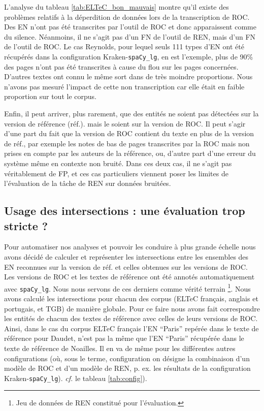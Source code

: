 L'analyse du tableau \ref{tab:ELTeC_bon_mauvais} montre qu'il existe des problèmes relatifs à la déperdition de données lors de la transcription de ROC. Des EN n'ont pas été transcrites par l'outil de ROC et donc apparaissent comme du silence. Néanmoins, il ne s'agit pas d'un FN de l'outil de REN, mais d'un FN de l'outil de ROC. Le cas Reynolds, pour lequel seuls 111 types d'EN ont été récupérés dans la configuration Kraken-\texttt{spaCy\_lg}, en est l'exemple, plus de 90\% des pages n'ont pas été transcrites à cause du flou sur les pages concernées. D'autres textes ont connu le même sort dans de très moindre proportions. Nous n'avons pas mesuré l'impact de cette non transcription car elle était en faible proportion sur tout le corpus.


Enfin, il peut arriver, plus rarement, que des entités ne soient pas détectées sur la version de référence (réf.). mais le soient sur la version de ROC. Il peut s'agir d'une part du fait que la version de ROC contient du texte en plus de la version de réf., par exemple les notes de bas de pages transcrites par la ROC mais non prises en compte par les auteurs de la référence, ou, d'autre part  d’une erreur du système même en contexte non bruité. Dans ces deux cas, il ne s’agit pas véritablement de FP, et ces cas particuliers viennent poser les limites de l'évaluation de la tâche de REN sur données bruitées.


\subsection{Usage des intersections : une évaluation trop stricte ?}
\label{subsec:inter_OCR-IMPACT-NER}
Pour automatiser nos analyses et pouvoir les conduire à plus grande échelle nous avons décidé de calculer et représenter les intersections entre les ensembles des EN reconnues sur la version de réf. et celles obtenues sur les versions de ROC. Les versions de ROC et les textes de référence ont été annotés automatiquement avec \texttt{spaCy\_lg}. Nous nous servons de ces derniers comme vérité terrain \footnote{Jeu de données de REN constitué pour l'évaluation.}. Nous avons calculé les intersections pour chacun des corpus (ELTeC français, anglais et portugais, et TGB) de manière globale. 
Pour ce faire nous avons fait correspondre les entités de chacun des textes de référence avec celles de leurs versions de ROC. Ainsi, dans le cas du corpus ELTeC français l'EN ``Paris'' repérée dans le texte de référence pour Daudet, n'est pas la même que l'EN ``Paris'' récupérée dans le texte de référence de Noailles. Il en va de même pour les différentes autres configurations (où, sous le terme, \og{}configuration\fg{} on désigne la combinaison d'un modèle de ROC et d'un modèle de REN, p. ex. les résultats de la configuration Kraken-\texttt{spaCy\_lg}). \textit{cf.} le tableau \ref{tab:config}).

